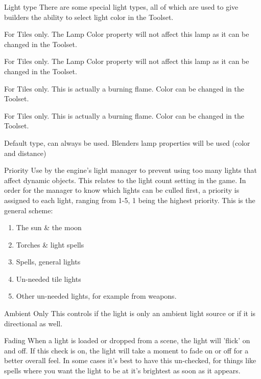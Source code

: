 \begin{propertyAurora}{Light type}
There are some special light types, all of which are used to give builders
the ability to select light color in the Toolset.
\begin{description}[leftmargin=8em,style=nextline]
    \item[Mainlight 1] For Tiles only. The Lamp Color property will not affect this lamp as it can be changed in the Toolset.
    \item[Mainlight 2] For Tiles only. The Lamp Color property will not affect this lamp as it can be changed in the Toolset.
    \item[Sourcelight 1] For Tiles only. This is actually a burning flame. Color can be changed in the Toolset.
    \item[Sourcelight 2] For Tiles only. This is actually a burning flame. Color can be changed in the Toolset.
    \item[Default] Default type, can always be used. Blenders lamp properties will be used (color and distance)
\end{description}
\end{propertyAurora}

\begin{propertyAurora}{Priority}
Use by the engine's light manager to prevent using too many lights that affect dynamic 
objects. This relates to the light count setting in the game. In order for the manager 
to know which lights can be culled first, a priority is assigned to each light, ranging from 1-5, 
1 being the highest priority. This is the general scheme:
\begin{enumerate}
    \item The sun \& the moon
    \item Torches \& light spells
    \item Spells, general lights
    \item Un-needed tile lights
    \item Other un-needed lights, for example from weapons.
\end{enumerate}
\end{propertyAurora}

\begin{propertyAurora}{Ambient Only}
This controls if the light is only an ambient light source or
if it is directional as well.
\end{propertyAurora}

\begin{propertyAurora}{Fading}
When a light is loaded or dropped from a scene, the light will 'flick' on and off. 
If this check is on, the light will take a moment to fade on or off for a better overall feel.
In some cases it’s best to have this un-checked, for things like spells where you want 
the light to be at it’s brightest as soon as it appears.
\end{propertyAurora}

